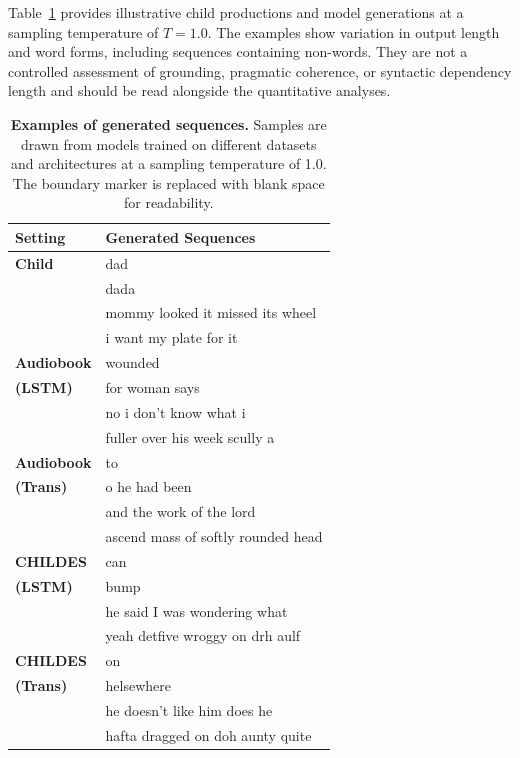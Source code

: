 Table~\ref{tab:generation-examples} provides illustrative child productions and model generations at a sampling temperature of $T=1.0$. The examples show variation in output length and word forms, including sequences containing non-words. They are not a controlled assessment of grounding, pragmatic coherence, or syntactic dependency length and should be read alongside the quantitative analyses.

\begin{table}[ht]
\centering
\begin{tabular}{ll}
\hline
\textbf{Setting} & \textbf{Generated Sequences} \\
\hline
\textbf{Child} & dad \\
                & dada \\
                & mommy looked it missed its wheel \\
                & i want my plate for it \\
\hline
\textbf{Audiobook}       & wounded \\
\textbf{(LSTM)}          & for woman says \\
                & no i don't know what i \\
                & fuller over his week scully a \\
\hline
\textbf{Audiobook}  & to \\
\textbf{(Trans)}                     & o he had been \\
                     & and the work of the lord \\
                     & ascend mass of softly rounded head \\
\hline
\textbf{CHILDES}          & can \\
\textbf{(LSTM)}               & bump \\
               & he said I was wondering what \\
               & yeah detfive wroggy on drh aulf \\
\hline
\textbf{CHILDES}          & on \\
\textbf{(Trans)}                   & helsewhere \\
                   & he doesn't like him does he \\
                   & hafta dragged on doh aunty quite \\
\hline
\end{tabular}
\caption{\textbf{Examples of generated sequences.} Samples are drawn from models trained on different datasets and architectures at a sampling temperature of 1.0. The boundary marker is replaced with blank space for readability.}
\label{tab:generation-examples}
\end{table}


